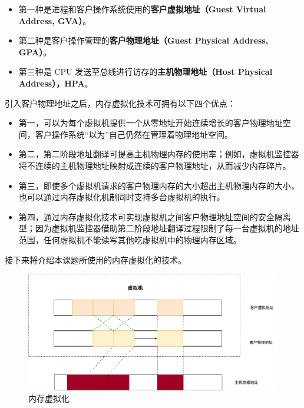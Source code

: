 \begin{itemize}
    \item 第一种是进程和客户操作系统使用的\textbf{客户虚拟地址（Guest Virtual Address, GVA）}。\cite{陈海波2019现代操作系统}
    \item 第二种是客户操作管理的\textbf{客户物理地址（Guest Physical Address, GPA）}。\cite{陈海波2019现代操作系统}
    \item 第三种是 CPU 发送至总线进行访存的\textbf{主机物理地址（Host Physical Address），HPA}。\cite{陈海波2019现代操作系统}
\end{itemize}

引入客户物理地址之后，内存虚拟化技术可拥有以下四个优点：

\begin{itemize}
    \item 第一，可以为每个虚拟机提供一个从零地址开始连续增长的客户物理地址空间，客户操作系统“以为”自己仍然在管理着物理地址空间。\cite{陈海波2019现代操作系统}
    \item 第二，第二阶段地址翻译可提高主机物理内存的使用率；例如，虚拟机监控器将不连续的主机物理地址映射成连续的客户物理地址，从而减少内存碎片。\cite{陈海波2019现代操作系统}
    \item 第三，即使多个虚拟机请求的客户物理内存的大小超出主机物理内存的大小，也可以通过内存虚拟化机制同时支持多台虚拟机的执行。\cite{陈海波2019现代操作系统}
    \item 第四，通过内存虚拟化技术可实现虚拟机之间客户物理地址空间的安全隔离型；因为虚拟机监控器借助第二阶段地址翻译过程限制了每一台虚拟机的地址范围，任何虚拟机不能读写其他吃虚拟机中的物理内存区域。\cite{陈海波2019现代操作系统}
\end{itemize}

接下来将介绍本课题所使用的内存虚拟化的技术。

\begin{figure}[]
    \centering
    \includegraphics[width=1\textwidth]{thesis-images/mm-virtualization.png}
    \caption{内存虚拟化}\label{fig:mm-virtualization}
\end{figure}



